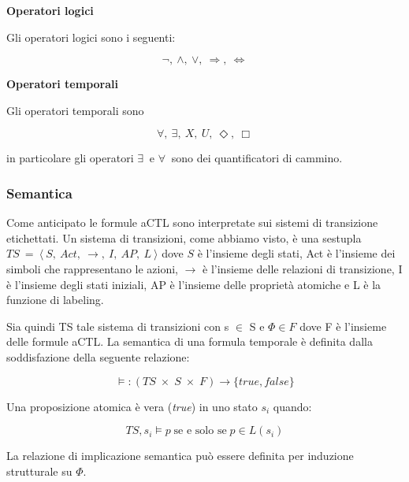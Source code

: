 \textbf{Operatori logici}

Gli operatori logici sono i seguenti:

\begin{equation}
  \neg,\ \wedge,\ \vee,\ \Rightarrow,\ \Leftrightarrow
\end{equation}


\textbf{Operatori temporali}

Gli operatori temporali sono

\begin{equation}
  \forall,\ \exists,\ X,\ U,\ \Diamond,\ \Box
\end{equation}



in particolare gli operatori $\exists\ $ e $\forall\ $ sono dei quantificatori di cammino.

\subsubsection{Semantica}

Come anticipato le formule aCTL sono interpretate sui sistemi di transizione etichettati. Un sistema di transizioni, come abbiamo visto, è una sestupla $TS\ =\ \langle\ S,\ Act,\ \rightarrow,\ I,\ AP,\ L\ \rangle$ dove $S$ è l'insieme degli stati, Act è l'insieme dei simboli che rappresentano le azioni, $\rightarrow$ è l'insieme delle relazioni di transizione, I è l'insieme degli stati iniziali, AP è l'insieme delle proprietà atomiche e L è la funzione di labeling.

Sia quindi TS tale sistema di transizioni con s $\in$ S e $\Phi \in F$ dove F è l'insieme delle formule aCTL.
La semantica di una formula temporale è definita dalla  soddisfazione della seguente relazione:

\begin{equation}
	\models : ( TS \; \times \; S \; \times \; F ) \rightarrow \lbrace true, false \rbrace
\end{equation}

\clearpage
Una proposizione atomica è vera (\emph{true}) in uno stato $s_i$ quando:

\begin{equation}
TS, s_i \models p \; \text{se e solo se}\; p \in L(s_i)
\end{equation}


La relazione di implicazione semantica può essere definita per induzione strutturale su $\Phi$.

